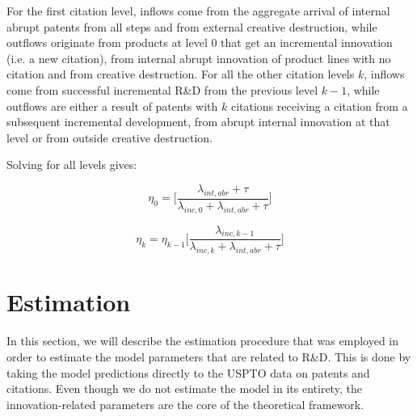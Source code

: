 \documentclass[letterpaper,12pt]{article}
\theoremstyle{definition}
\begin{document}
For the first citation level, inflows come from the aggregate arrival of internal abrupt patents from all steps and from external creative destruction, while outflows originate from products at level 0 that get an incremental innovation (i.e. a new citation), from internal abrupt innovation of product lines with no citation and from creative destruction. For all the other citation levels $k$, inflows come from successful incremental R\&D from the previous level $k-1$, while outflows are either a result of patents with $k$ citations receiving a citation from a subsequent incremental development, from abrupt internal innovation at that level or from outside creative destruction.

Solving for all levels gives:

\begin{equation} \label{eq:eta0}
\eta_0 = \Big[\frac{\lambda_{int,abr} + \tau}{\lambda_{inc,0} +\lambda_{int,abr} + \tau}\Big]
\end{equation}

\begin{equation} \label{eq:etak}
\eta_k = \eta_{k-1}\Big[\frac{\lambda_{inc,k-1}}{\lambda_{inc,k} +\lambda_{int,abr} + \tau}\Big]
\end{equation}

\section{Estimation}\label{sec:Estimation}

In this section, we will describe the estimation procedure that was employed in order to estimate the model parameters that are related to R\&D. This is done by taking the model predictions directly to the USPTO data on patents and citations. Even though we do not estimate the model in its entirety, the innovation-related parameters are the core of the theoretical framework.
\end{document}
